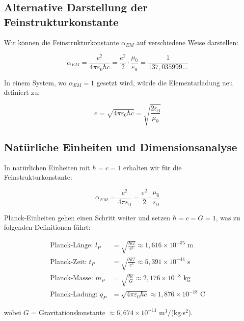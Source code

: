 \documentclass[12pt,a4paper]{article}
\begin{document}
	\subsection{Alternative Darstellung der Feinstrukturkonstante}
	
	Wir können die Feinstrukturkonstante $\alpha_{EM}$ auf verschiedene Weise darstellen:
	
	\begin{equation}
		\alpha_{EM} = \frac{e^2}{4\pi\varepsilon_0\hbar c} = \frac{e^2}{2} \cdot \frac{\mu_0}{\varepsilon_0} = \frac{1}{137,035999...}
	\end{equation}
	
	In einem System, wo $\alpha_{EM} = 1$ gesetzt wird, würde die Elementarladung neu definiert zu:
	
	\begin{equation}
		e = \sqrt{4\pi\varepsilon_0\hbar c} = \sqrt{\frac{2\varepsilon_0}{\mu_0}}
	\end{equation}
	
	\subsection{Natürliche Einheiten und Dimensionsanalyse}
	
	In natürlichen Einheiten mit $\hbar = c = 1$ erhalten wir für die Feinstrukturkonstante:
	
	\begin{equation}
		\alpha_{EM} = \frac{e^2}{4\pi\varepsilon_0} = \frac{e^2}{2} \cdot \frac{\mu_0}{\varepsilon_0}
	\end{equation}
	
	Planck-Einheiten gehen einen Schritt weiter und setzen $\hbar = c = G = 1$, was zu folgenden Definitionen führt:
	
	\begin{align}
		\text{Planck-Länge: } l_P &= \sqrt{\frac{\hbar G}{c^3}} \approx 1,616 \times 10^{-35} \text{ m}\\
		\text{Planck-Zeit: } t_P &= \sqrt{\frac{\hbar G}{c^5}} \approx 5,391 \times 10^{-44} \text{ s}\\
		\text{Planck-Masse: } m_P &= \sqrt{\frac{\hbar c}{G}} \approx 2,176 \times 10^{-8} \text{ kg}\\
		\text{Planck-Ladung: } q_P &= \sqrt{4\pi\varepsilon_0\hbar c} \approx 1,876 \times 10^{-18} \text{ C}
	\end{align}
	
	wobei $G$ = Gravitationskonstante $\approx 6,674 \times 10^{-11}$ m$^3$/(kg$\cdot$s$^2$).
	
\end{document}
